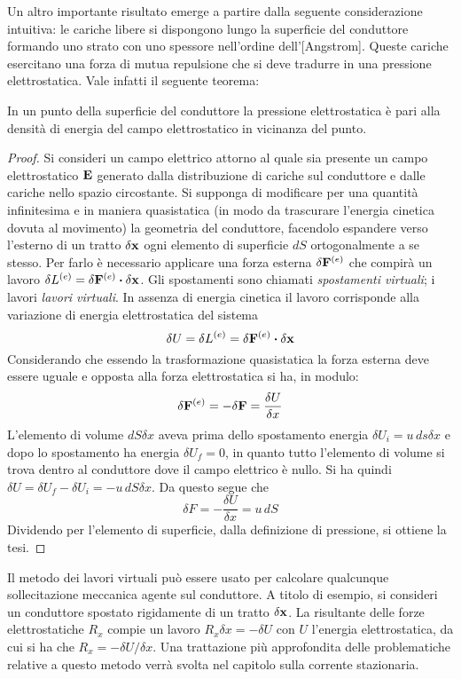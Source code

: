 Un altro importante risultato emerge a partire dalla seguente considerazione intuitiva: le cariche libere si dispongono
lungo la superficie del conduttore formando uno strato con uno spessore nell'ordine dell'[Angstrom]. Queste cariche
esercitano una forza di mutua repulsione che si deve tradurre in una pressione elettrostatica. Vale infatti il seguente teorema:
\begin{thm}%
    In un punto della superficie del conduttore la pressione elettrostatica è pari alla densità di energia del campo
    elettrostatico in vicinanza del punto.
\end{thm}
\begin{proof}
    Si consideri un campo elettrico attorno al quale sia presente un campo elettrostatico $\vb{E}$ generato dalla distribuzione
    di cariche sul conduttore e dalle cariche nello spazio circostante. Si supponga di modificare per una quantità
    infinitesima e in maniera quasistatica (in modo da trascurare l'energia cinetica dovuta al movimento) la geometria
    del conduttore, facendolo espandere verso l'esterno di un tratto $\delta \vb{x}$ ogni elemento di superficie
    $dS$ ortogonalmente a se stesso. Per farlo è necessario applicare una forza esterna $\delta \vb{F}^{(e)}$ che
    compirà un lavoro $\delta L^{(e)}=\delta\vb{F}^{(e)}\vdot\delta\vb{x}$. Gli spostamenti sono chiamati \textit{spostamenti virtuali};
    i lavori \textit{lavori virtuali}. In assenza di energia cinetica il lavoro corrisponde alla variazione di energia elettrostatica del sistema
    \[
        \delta U=\delta L^{(e)}=\delta\vb{F}^{(e)}\vdot\delta\vb{x}
    \]
    Considerando che essendo la trasformazione quasistatica la forza esterna deve essere uguale e opposta alla forza elettrostatica si ha, in modulo:
    \[
        \delta\vb{F}^{(e)}=-\delta\vb{F}=\frac{\delta U}{\delta x}
    \]
    L'elemento di volume $dS\delta x$ aveva prima dello spostamento energia $\delta U_i=u\,ds\delta x$ e dopo lo spostamento
    ha energia $\delta U_f=0$, in quanto tutto l'elemento di volume si trova dentro al conduttore dove il campo elettrico
    è nullo. Si ha quindi $\delta U=\delta U_f -\delta U_i=-u\,dS\delta x$. Da questo segue che
    \[
        \delta F=-\frac{\delta U}{\delta x}=u\,dS
    \]
    Dividendo per l'elemento di superficie, dalla definizione di pressione, si ottiene la tesi.
\end{proof}
Il metodo dei lavori virtuali può essere usato per calcolare qualcunque sollecitazione meccanica agente sul
conduttore. A titolo di esempio, si consideri un conduttore spostato rigidamente di un tratto $\delta \vb{x}$.
La risultante delle forze elettrostatiche $R_x$ compie un lavoro $R_x \delta x=-\delta U$ con $U$ l'energia elettrostatica,
da cui si ha che $R_x=-\delta U/\delta x$. Una trattazione più approfondita delle problematiche relative a questo
metodo verrà svolta nel capitolo sulla corrente stazionaria.

